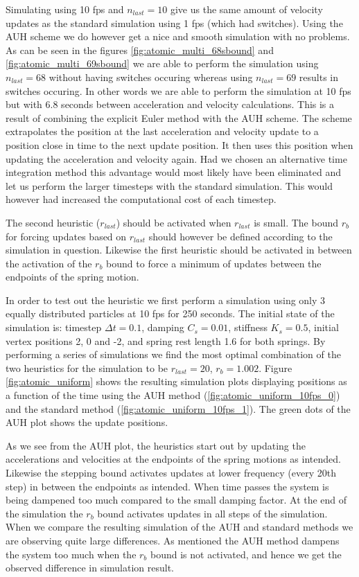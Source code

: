 \documentclass[11pt]{article}
\begin{document}
Simulating using 10 fps and $n_{last} = 10$ give us the same amount of
velocity updates as the standard simulation using 1 fps (which had switches).
Using the AUH scheme we do however get a nice and smooth simulation with no
problems. As can be seen in the figures \ref{fig:atomic_multi_68sbound} and
\ref{fig:atomic_multi_69sbound} we are able to perform the simulation using
$n_{last} = 68$ without having switches occuring whereas using $n_{last} =
69$ results in switches occuring. In other words we are able to perform the
simulation at 10 fps but with 6.8 seconds between acceleration and velocity
calculations. This is a result of combining the explicit Euler method with
the AUH scheme. The scheme extrapolates the position at the last
acceleration and velocity update to a position close in time to the next
update position. It then uses this position when updating the acceleration
and velocity again. Had we chosen an alternative time integration method this
advantage would most likely have been eliminated and let us perform the larger
timesteps with the standard simulation. This would however had increased the
computational cost of each timestep.

The second heuristic ($r_{last}$) should be activated when $r_{last}$ is
small. The bound $r_{b}$ for forcing updates based on $r_{last}$ should
however be defined according to the simulation in question. Likewise the
first heuristic should be activated in between the activation of the $r_b$
bound to force a minimum of updates between the endpoints of the spring
motion.

In order to test out the heuristic we first perform a simulation using
only 3 equally distributed particles at 10 fps for 250 seconds. The initial
state of the simulation is: timestep $\Delta t = 0.1$, damping $C_s = 0.01$,
stiffness $K_s = 0.5$, initial vertex positions 2, 0 and -2, and spring rest
length 1.6 for both springs. By performing a series of simulations we find
the most optimal combination of the two heuristics for the simulation to be
$r_{last} = 20$, $r_b = 1.002$. Figure \ref{fig:atomic_uniform} shows the
resulting simulation plots displaying positions as a function of the time
using the AUH method (\ref{fig:atomic_uniform_10fps_0}) and the standard
method (\ref{fig:atomic_uniform_10fps_1}). The green dots of the AUH plot
shows the update positions.

As we see from the AUH plot, the heuristics start out by updating the
accelerations and velocities at the endpoints of the spring motions as
intended. Likewise the stepping bound activates updates at lower frequency
(every 20th step) in between the endpoints as intended. When time passes the
system is being dampened too much compared to the small damping factor. At the
end of the simulation the $r_b$ bound activates updates in all steps of the
simulation. When we compare the resulting simulation of the AUH and standard
methods we are observing quite large differences. As mentioned the AUH method
dampens the system too much when the $r_b$ bound is not activated, and hence we
get the observed difference in simulation result.
\end{document}
